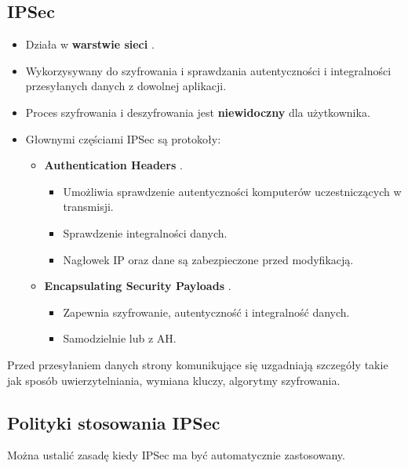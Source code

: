 \documentclass[../sk-egzamin.tex]{subfiles}
\begin{document}

\subsection*{IPSec}
\begin{itemize}
    \item Działa w \textbf{warstwie sieci} .

    \item Wykorzysywany do szyfrowania i sprawdzania autentyczności i
    integralności przesyłanych danych z dowolnej aplikacji.

    \item Proces szyfrowania i deszyfrowania jest \textbf{niewidoczny}
    dla użytkownika.

    \item Głownymi częściami IPSec są protokoły:
    \begin{itemize}
        \item \textbf{Authentication Headers} .
        \begin{itemize}
            \item Umożliwia sprawdzenie autentyczności komputerów
            uczestniczących w transmisji.
            \item Sprawdzenie integralności danych.
            \item Nagłowek IP oraz dane są zabezpieczone przed modyfikacją.
        \end{itemize}
        \item \textbf{Encapsulating Security Payloads} .
        \begin{itemize}
            \item Zapewnia szyfrowanie, autentyczność i integralność danych.
            \item Samodzielnie lub z AH.
        \end{itemize}
    \end{itemize}
\end{itemize}

Przed przesyłaniem danych strony komunikujące się uzgadniają szczegóły takie
jak sposób uwierzytelniania, wymiana kluczy, algorytmy szyfrowania.

\subsection*{Polityki stosowania IPSec}
Można ustalić zasadę kiedy IPSec ma być automatycznie zastosowany.
\end{document}
